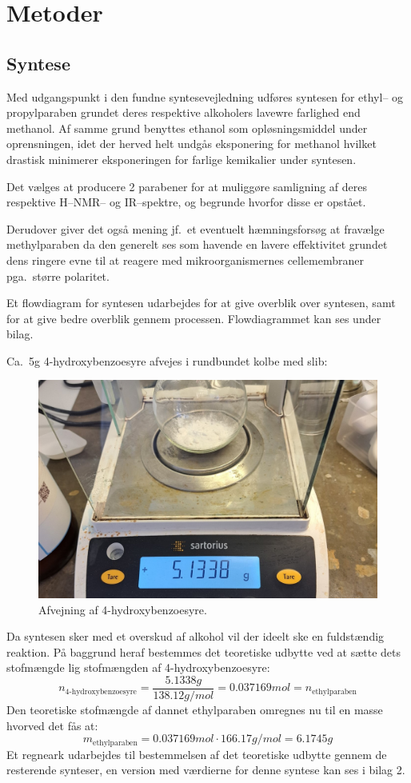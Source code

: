 \section{Metoder}
    \subsection{Syntese} 
    Med udgangspunkt i den fundne syntesevejledning \parencite{Ole2019} udføres syntesen for ethyl-- og propylparaben grundet deres respektive alkoholers lavewre farlighed end methanol. Af samme grund benyttes ethanol som opløsningsmiddel under oprensningen, idet der herved helt undgås eksponering for methanol hvilket drastisk minimerer eksponeringen for farlige kemikalier under syntesen.

    Det vælges at producere 2 parabener for at muliggøre samligning af deres respektive H--NMR-- og IR--spektre, og begrunde hvorfor disse er opstået. 

    Derudover giver det også mening jf.\ et eventuelt hæmningsforsøg at fravælge methylparaben da den generelt ses som havende en lavere effektivitet grundet dens ringere evne til at reagere med mikroorganismernes cellemembraner pga.\ større polaritet.

    Et flowdiagram for syntesen udarbejdes for at give overblik over syntesen, samt for at give bedre overblik gennem processen. Flowdiagrammet kan ses under bilag.

    Ca.\ 5g 4-hydroxybenzoesyre afvejes i rundbundet kolbe med slib:
    \begin{figure}[H] \centering
        \includegraphics[width=\textwidth]{billeder/afvejning}
        \caption{Afvejning af 4-hydroxybenzoesyre.}
    \end{figure} 
    Da syntesen sker med et overskud af alkohol vil der ideelt ske en fuldstændig reaktion. På baggrund heraf bestemmes det teoretiske udbytte ved at sætte dets stofmængde lig stofmængden af 4-hydroxybenzoesyre:
    \[
        n_{\text{4-hydroxybenzoesyre}}=\frac{5.1338\si{g}}{138.12\si{g \per mol}}=0.037169\si{mol}=n_{\text{ethylparaben}}
    \]
    Den teoretiske stofmængde af dannet ethylparaben omregnes nu til en masse hvorved det fås at:
    \[
        m_{\text{ethylparaben}}=0.037169\si{mol} \cdot 166.17\si{g\per mol}=6.1745g
    \]
    Et regneark udarbejdes til bestemmelsen af det teoretiske udbytte gennem de resterende synteser, en version med værdierne for denne syntese kan ses i bilag 2.

